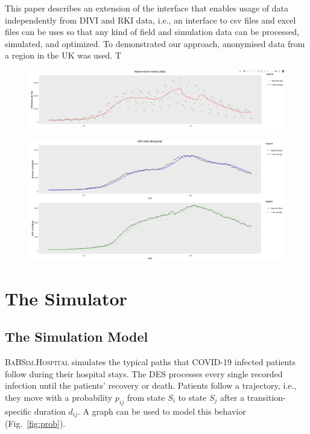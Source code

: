 \documentclass[conference]{IEEEtran}
\def\figref#1{Fig.~\ref{#1}}
\newcommand{\babsimhospital}{\textsc{BaBSim.Hospital}\xspace}
\begin{document}
This paper describes an extension of the interface that enables usage of data independently from \gls{DIVI} and \gls{RKI} data, i.e., an interface to csv files and excel files can be uses so that any kind of field and simulation data can be processed, simulated, and optimized.
To demonstrated our approach, anonymised data from a region in the UK was used. T

\begin{figure}
    \centering
    \includegraphics[width=0.75\linewidth]{rkidata.png}
    \caption{}
\label{fig:rki}
\end{figure}

\begin{figure}
    \centering
    \includegraphics[width=0.75\linewidth]{dividata.png}
    \caption{}
\label{fig:divi}
\end{figure}

\section{The Simulator}\label{sec:sim}
\subsection{The Simulation Model}

\babsimhospital simulates the typical paths that COVID-19 infected patients follow during their hospital stays. 
The \gls{DES} processes every single recorded infection until the patients' recovery or death. 
Patients follow a trajectory, i.e., they move with a probability $p_{ij}$ from state $S_i$ to state $S_j$  after a transition-specific duration $d_{ij}$.
A graph can be used to model this behavior (\figref{fig:prob}).
\end{document}
